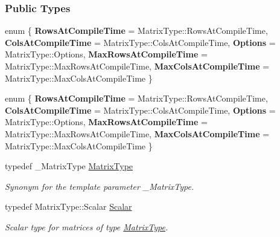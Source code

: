 \subsubsection*{Public Types}
\begin{DoxyCompactItemize}
\item 
\mbox{\label{group___eigenvalues___module_a66eec77af3151c5807f6f8421d4fd22f}} 
enum \{ \newline
{\bfseries Rows\+At\+Compile\+Time} = Matrix\+Type\+:\+:Rows\+At\+Compile\+Time, 
{\bfseries Cols\+At\+Compile\+Time} = Matrix\+Type\+:\+:Cols\+At\+Compile\+Time, 
{\bfseries Options} = Matrix\+Type\+:\+:Options, 
{\bfseries Max\+Rows\+At\+Compile\+Time} = Matrix\+Type\+:\+:Max\+Rows\+At\+Compile\+Time, 
\newline
{\bfseries Max\+Cols\+At\+Compile\+Time} = Matrix\+Type\+:\+:Max\+Cols\+At\+Compile\+Time
 \}
\item 
\mbox{\label{group___eigenvalues___module_aeb411a7dda7f0495406b8e2ee5289854}} 
enum \{ \newline
{\bfseries Rows\+At\+Compile\+Time} = Matrix\+Type\+:\+:Rows\+At\+Compile\+Time, 
{\bfseries Cols\+At\+Compile\+Time} = Matrix\+Type\+:\+:Cols\+At\+Compile\+Time, 
{\bfseries Options} = Matrix\+Type\+:\+:Options, 
{\bfseries Max\+Rows\+At\+Compile\+Time} = Matrix\+Type\+:\+:Max\+Rows\+At\+Compile\+Time, 
\newline
{\bfseries Max\+Cols\+At\+Compile\+Time} = Matrix\+Type\+:\+:Max\+Cols\+At\+Compile\+Time
 \}
\item 
\mbox{\label{group___eigenvalues___module_a83acd180404ddaac8a678fa65a6b632b}} 
typedef \+\_\+\+Matrix\+Type \hyperlink{group___eigenvalues___module_a83acd180404ddaac8a678fa65a6b632b}{Matrix\+Type}
\begin{DoxyCompactList}\small\item\em Synonym for the template parameter {\ttfamily \+\_\+\+Matrix\+Type}. \end{DoxyCompactList}\item 
\mbox{\label{group___eigenvalues___module_a017d49fe0d59874b70a2fcf35e5aa373}} 
typedef Matrix\+Type\+::\+Scalar \hyperlink{group___eigenvalues___module_a017d49fe0d59874b70a2fcf35e5aa373}{Scalar}
\begin{DoxyCompactList}\small\item\em Scalar type for matrices of type \hyperlink{group___eigenvalues___module_a83acd180404ddaac8a678fa65a6b632b}{Matrix\+Type}. \end{DoxyCompactList}\item 

\end{DoxyCompactItemize}
